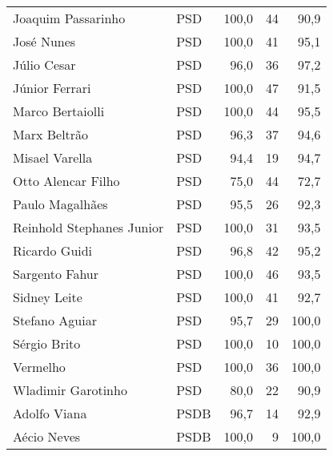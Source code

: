 \begin{longtable}{llrrr}
                  Joaquim Passarinho &            PSD &     100,0 &           44 &       90,9 \\
                          José Nunes &            PSD &     100,0 &           41 &       95,1 \\
                         Júlio Cesar &            PSD &      96,0 &           36 &       97,2 \\
                      Júnior Ferrari &            PSD &     100,0 &           47 &       91,5 \\
                    Marco Bertaiolli &            PSD &     100,0 &           44 &       95,5 \\
                        Marx Beltrão &            PSD &      96,3 &           37 &       94,6 \\
                      Misael Varella &            PSD &      94,4 &           19 &       94,7 \\
                  Otto Alencar Filho &            PSD &      75,0 &           44 &       72,7 \\
                     Paulo Magalhães &            PSD &      95,5 &           26 &       92,3 \\
           Reinhold Stephanes Junior &            PSD &     100,0 &           31 &       93,5 \\
                       Ricardo Guidi &            PSD &      96,8 &           42 &       95,2 \\
                      Sargento Fahur &            PSD &     100,0 &           46 &       93,5 \\
                        Sidney Leite &            PSD &     100,0 &           41 &       92,7 \\
                      Stefano Aguiar &            PSD &      95,7 &           29 &      100,0 \\
                        Sérgio Brito &            PSD &     100,0 &           10 &      100,0 \\
                            Vermelho &            PSD &     100,0 &           36 &      100,0 \\
                  Wladimir Garotinho &            PSD &      80,0 &           22 &       90,9 \\
                        Adolfo Viana &           PSDB &      96,7 &           14 &       92,9 \\
                         Aécio Neves &           PSDB &     100,0 &            9 &      100,0 \\

\end{longtable}
